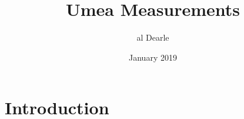 \documentclass{article}
\title{Umea Measurements}
\author{al Dearle}
\date{January 2019}
\begin{document}
\maketitle

\section{Introduction}
\end{document}
